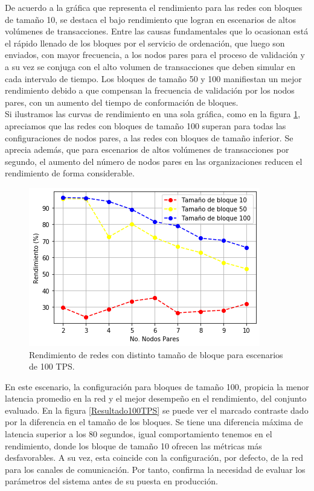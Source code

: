 De acuerdo a la gr\'afica que representa el rendimiento para las redes con bloques de tama\~no 10, se destaca el bajo rendimiento que logran en escenarios de altos vol\'umenes de transacciones. Entre las causas fundamentales que lo ocasionan est\'a el r\'apido llenado de los bloques por el servicio de ordenaci\'on, que luego son enviados, con mayor frecuencia, a los nodos pares para el proceso de validaci\'on y a su vez se conjuga con el alto volumen de transacciones que deben simular en cada intervalo de tiempo. Los bloques de tama\~no 50 y 100 manifiestan un mejor rendimiento debido a que compensan la frecuencia de validaci\'on por los nodos pares, con un aumento del tiempo de conformaci\'on de bloques.\\

Si ilustramos las curvas de rendimiento en una sola gr\'afica, como en la figura \ref{RendimientoPares100TPS}, apreciamos que las redes con bloques de tama\~no 100 superan para todas las configuraciones de nodos pares, a las redes con bloques de tama\~no inferior. Se aprecia adem\'as, que para escenarios de altos vol\'umenes de transacciones por segundo, el aumento del n\'umero de nodos pares en las organizaciones reducen el rendimiento de forma considerable.

\begin{figure}[h]
\centering
\includegraphics[scale=0.5]{Graphics/RendimientoPares100TPS.png}
\caption{Rendimiento de redes con distinto tama\~no de bloque para escenarios de 100 TPS.}
\label{RendimientoPares100TPS}
\end{figure}

En este escenario, la configuraci\'on para bloques de tama\~no 100, propicia la menor latencia promedio en la red y el mejor desempe\~no en el rendimiento, del conjunto evaluado. En la figura \ref{Resultado100TPS} se puede ver el marcado contraste dado por la diferencia en el tama\~no de los bloques. Se tiene una diferencia m\'axima de latencia superior a los 80 segundos, igual comportamiento tenemos en el rendimiento, donde los bloque de tama\~no 10 ofrecen las m\'etricas m\'as desfavorables. A su vez, esta coincide con la configuraci\'on, por defecto, de la red para los canales de comunicaci\'on. Por tanto, confirma la necesidad de evaluar los par\'ametros del sistema antes de su puesta en producci\'on.\\

